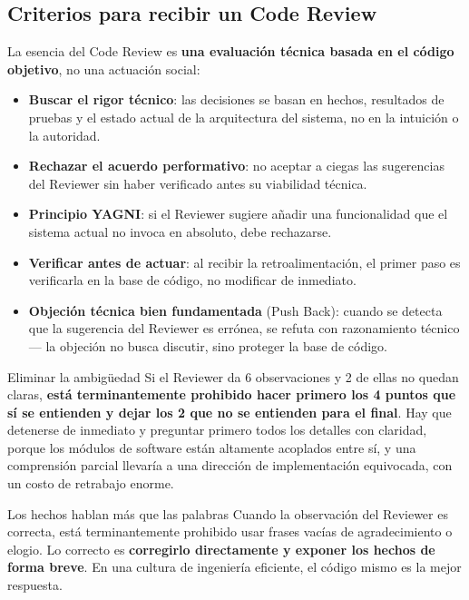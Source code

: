 \subsection{Criterios para recibir un Code Review}

La esencia del Code Review es \textbf{una evaluación técnica basada en el código objetivo}, no una actuación social:

\begin{itemize}
    \item \textbf{Buscar el rigor técnico}: las decisiones se basan en hechos, resultados de pruebas y el estado actual de la arquitectura del sistema, no en la intuición o la autoridad.
    \item \textbf{Rechazar el acuerdo performativo}: no aceptar a ciegas las sugerencias del Reviewer sin haber verificado antes su viabilidad técnica.
    \item \textbf{Principio YAGNI}: si el Reviewer sugiere añadir una funcionalidad que el sistema actual no invoca en absoluto, debe rechazarse.
    \item \textbf{Verificar antes de actuar}: al recibir la retroalimentación, el primer paso es verificarla en la base de código, no modificar de inmediato.
    \item \textbf{Objeción técnica bien fundamentada} (Push Back): cuando se detecta que la sugerencia del Reviewer es errónea, se refuta con razonamiento técnico — la objeción no busca discutir, sino proteger la base de código.
\end{itemize}

\begin{knowledgebox}{Eliminar la ambigüedad}
Si el Reviewer da 6 observaciones y 2 de ellas no quedan claras, \textbf{está terminantemente prohibido hacer primero los 4 puntos que sí se entienden y dejar los 2 que no se entienden para el final}. Hay que detenerse de inmediato y preguntar primero todos los detalles con claridad, porque los módulos de software están altamente acoplados entre sí, y una comprensión parcial llevaría a una dirección de implementación equivocada, con un costo de retrabajo enorme.
\end{knowledgebox}

\begin{importantbox}{Los hechos hablan más que las palabras}
Cuando la observación del Reviewer es correcta, está terminantemente prohibido usar frases vacías de agradecimiento o elogio. Lo correcto es \textbf{corregirlo directamente y exponer los hechos de forma breve}. En una cultura de ingeniería eficiente, el código mismo es la mejor respuesta.
\end{importantbox}

